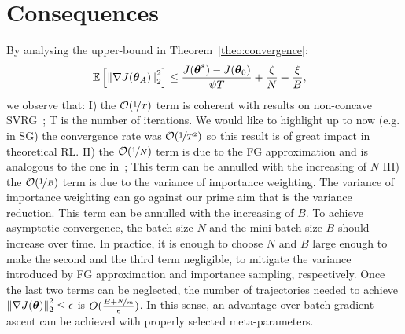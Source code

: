 \section{Consequences}\label{sec:consequence}

By analysing the upper-bound in Theorem~\ref{theo:convergence}:
	\begin{align*}
&\EVV[]
{\norm[2]{\nabla J(\vtheta_A)}^2} 
\leq
\frac{J(\vtheta^*)-J(\vtheta_0)}{\psi T} +
\frac{\zeta}{N}
+\frac{\xi}{B},
\end{align*}
 we observe that: I) the $\mathcal{O}(\nicefrac{1}{T})$ term is coherent with results on non-concave SVRG~\citep[\eg][]{reddi2016stochastic}; T is the number of iterations. We would like to highlight up to now (e.g. in \acs{SG}) the convergence rate was $\mathcal{O}(\nicefrac{1}{T^2})$ so this result is of great impact in theoretical \acs{RL}. II) the $\mathcal{O}(\nicefrac{1}{N})$ term is due to the FG approximation and is analogous to the one in~\citep{harikandeh2015stopwasting}; This term can be annulled with the increasing of $N$ III) the $\mathcal{O}(\nicefrac{1}{B})$ term is due to the variance of importance weighting. The variance of importance weighting can go against our prime aim that is the variance reduction.  This term can be annulled with the increasing of $B$.
To achieve asymptotic convergence, the batch size $N$ and the mini-batch size $B$ should increase over time. 
In practice, it is enough to choose $N$ and $B$ large enough to make the second and the third term negligible, \ie to mitigate the variance introduced by FG approximation and importance sampling, respectively.
Once the last two terms can be neglected, the number of trajectories needed to achieve $\norm[2]{\gradJ{\vtheta}}^2\leq\epsilon$ is $O(\frac{B+\nicefrac{N}{m}}{\epsilon})$. In this sense, an advantage over batch gradient ascent can be achieved with properly selected meta-parameters. 